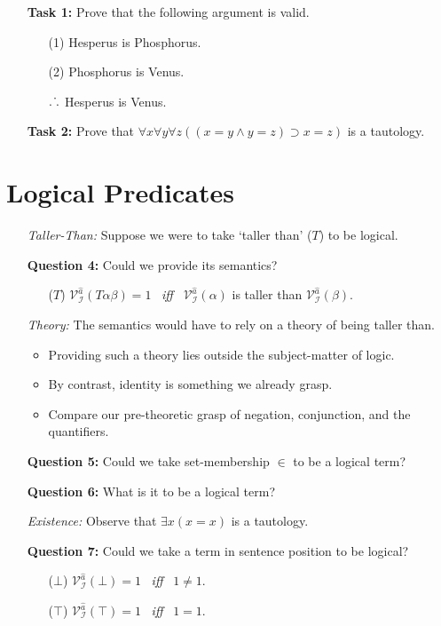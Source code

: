 \documentclass[a4paper, 11pt]{article} %
\def\therefore{\ensuremath{\ldotp\dot\,\ldotp}}
\newcommand{\I}{\mathcal{I}}
\newcommand{\VV}[2]{\mathcal{V}_{#1}^{#2}} %
\begin{document}
\begin{enumerate}
  \item[\bf Task 1:] Prove that the following argument is valid.
    \begin{itemize}
      \item[(1)] Hesperus is Phosphorus.
      \item[(2)] Phosphorus is Venus.
      \item[$\therefore$] Hesperus is Venus.
    \end{itemize}
  \item[\bf Task 2:] Prove that $\forall x\forall y\forall z((x=y \wedge y=z) \supset x=z)$ is a tautology. 
\end{enumerate}





\section*{Logical Predicates}

\begin{enumerate}
  \item[\it Taller-Than:] Suppose we were to take `taller than' ($T$) to be logical.
  \item[\bf Question 4:] Could we provide its semantics?
    \begin{itemize}
      \item[($T$)] $\VV{\I}{\hat{a}}(T\alpha\beta)=1$ ~\textit{iff}~ $\VV{\I}{\hat{a}}(\alpha)$ is taller than $\VV{\I}{\hat{a}}(\beta)$.
    \end{itemize}
  \item[\it Theory:] The semantics would have to rely on a theory of being taller than.
    \begin{itemize}
      \item Providing such a theory lies outside the subject-matter of logic.
      \item By contrast, identity is something we already grasp.
      \item Compare our pre-theoretic grasp of negation, conjunction, and the quantifiers.
    \end{itemize}
  \item[\bf Question 5:] Could we take set-membership $\in$ to be a logical term? 
  \item[\bf Question 6:] What is it to be a logical term?
  \item[\it Existence:] Observe that $\exists x(x=x)$ is a tautology. 
  \item[\bf Question 7:] Could we take a term in sentence position to be logical?
    \begin{itemize}
        \item[($\bot$)] $\VV{\I}{\hat{a}}(\bot)=1$ ~\textit{iff}~ $1\neq 1$.
        \item[($\top$)] $\VV{\I}{\hat{a}}(\top)=1$ ~\textit{iff}~ $1=1$.
    \end{itemize}
\end{enumerate}
\end{document}
